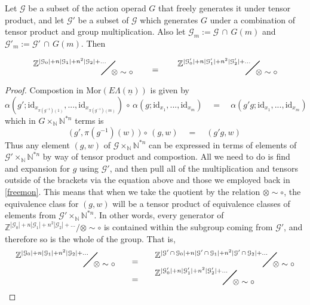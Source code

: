 \documentclass{amsbook} %
\newcommand{\bigquotient}[2]{ \raisebox{0.75\height}{$#1$} \mkern-12mu\scalebox{2}{$\diagup$}\mkern-10mu \raisebox{-0.5\height}{$#2$} }
\newcommand{\ELn}{E\Lambda(\underline{n})}
\numberwithin{section}{chapter}
\begin{document}
\begin{lem} Let $\mathcal{G}$ be a subset of the action operad $G$ that freely generates it under tensor product, and let $\mathcal{G'}$ be a subset of $\mathcal{G}$ which generates $G$ under a combination of tensor product and group multiplication. Also let $\mathcal{G}_m := \mathcal{G} \, \cap \,  G(m)$ and $\mathcal{G}'_m := \mathcal{G}' \, \cap \,  G(m)$. Then

\[ \bigquotient{\mathbb{Z}^{|\mathcal{G}_0| + n|\mathcal{G}_1| + n^2 |\mathcal{G}_2| + ...}}{\otimes \sim \circ} \quad \quad = \quad \quad \bigquotient{\mathbb{Z}^{|\mathcal{G}'_0| + n|\mathcal{G}'_1| + n^2 |\mathcal{G}'_2| + ...}}{\otimes \sim \circ} \]
\end{lem}
\begin{proof} 
Compostion in $\mathrm{Mor}(\ELn)$ is given by
\[ \alpha(g'; \mathrm{id}_{x_{\pi(g^{-1})(1)}}, ..., \mathrm{id}_{x_{\pi(g^{-1})(m)}}) \, \circ \, \alpha(g; \mathrm{id}_{x_1}, ..., \mathrm{id}_{x_m}) \quad = \quad \alpha(g'g; \mathrm{id}_{x_1}, ..., \mathrm{id}_{x_m})\]
which in $G \times_{\mathbb{N}} \mathbb{N}^{\ast n}$ terms is
\[ \big( \, g', \pi(g^{-1})(w) \, \big) \, \circ \, (g, w) \quad = \quad (g'g, w) \]
Thus any element $(g, w)$ of $\mathcal{G} \times_{\mathbb{N}} \mathbb{N}^{\ast n}$ can be expressed in terms of elements of $\mathcal{G}' \times_{\mathbb{N}} \mathbb{N}^{\ast n}$ by way of tensor product and compostion. All we need to do is find and expansion for $g$ using $\mathcal{G}'$, and then pull all of the multiplication and tensors outside of the brackets via the equation above and those we employed back in \cref{freemon}. This means that when we take the quotient by the relation $\otimes \sim \circ$, the equivalence class for $(g, w)$ will be a tensor product of equivalence classes of elements from $\mathcal{G}' \times_{\mathbb{N}} \mathbb{N}^{\ast n}$. In other words, every generator of $\mathbb{Z}^{|\mathcal{G}_0| + n|\mathcal{G}_1| + n^2 |\mathcal{G}_2| + ...}/\otimes \sim \circ$ is contained within the subgroup coming from $\mathcal{G}'$, and therefore so is the whole of the group. That is, 
\[ \begin{array}{rcl}
			\bigquotient{\mathbb{Z}^{|\mathcal{G}_0| + n|\mathcal{G}_1| + n^2 |\mathcal{G}_2| + ...}}{\otimes \sim \circ} \quad & = & \quad \bigquotient{\mathbb{Z}^{|\mathcal{G}' \, \cap \, \mathcal{G}_0| + n|\mathcal{G}' \, \cap \, \mathcal{G}_1| + n^2 |\mathcal{G}' \, \cap \, \mathcal{G}_2| + ...}}{\otimes \sim \circ} \\
			& = & \quad \bigquotient{\mathbb{Z}^{|\mathcal{G}'_0| + n|\mathcal{G}'_1| + n^2 |\mathcal{G}'_2| + ...}}{\otimes \sim \circ}
		\end{array}
\]
\end{proof}
\end{document}
